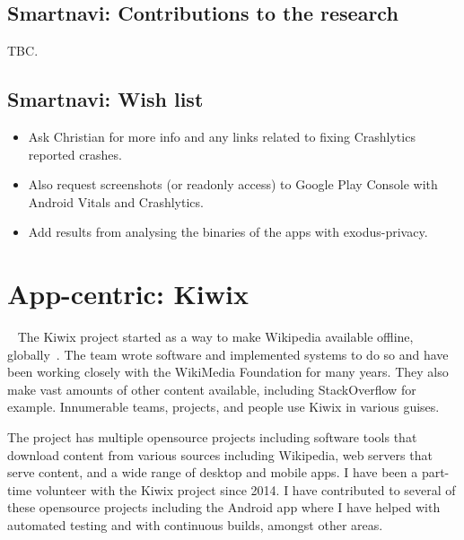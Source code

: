 \subsection{Smartnavi: Contributions to the research}
TBC.

\subsection*{Smartnavi: Wish list}
{\small
\begin{itemize}
    \itemsep0em
    \item Ask Christian for more info and any links related to fixing Crashlytics reported crashes.
    \item Also request screenshots (or readonly access) to Google Play Console with Android Vitals and Crashlytics.
    \item Add results from analysing the binaries of the apps with exodus-privacy.
\end{itemize}
}


\clearpage


\section{App-centric: Kiwix}~\label{case-study-overview-kiwix}
The Kiwix project started as a way to make Wikipedia available offline, globally~\citep{sutherland2014_wikimedia_on_kelson}. The team wrote software and implemented systems to do so and have been working closely with the WikiMedia Foundation for many years. They also make vast amounts of other content available, including StackOverflow for example. Innumerable teams, projects, and people use Kiwix in various guises.

The project has multiple opensource projects including software tools that download content from various sources including Wikipedia, web servers that serve content, and a wide range of desktop and mobile apps. I have been a part-time volunteer with the Kiwix project since 2014. I have contributed to several of these opensource projects including the Android app where I have helped with automated testing and with continuous builds, amongst other areas.

